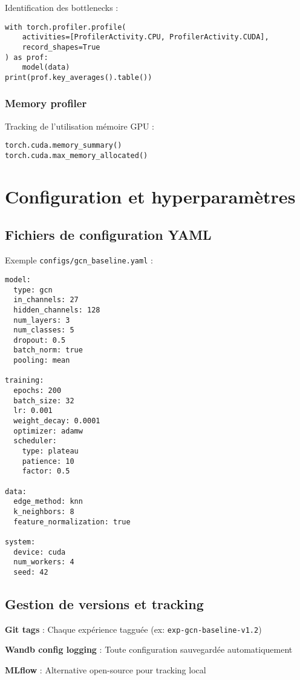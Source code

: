 Identification des bottlenecks :
\begin{verbatim}
with torch.profiler.profile(
    activities=[ProfilerActivity.CPU, ProfilerActivity.CUDA],
    record_shapes=True
) as prof:
    model(data)
print(prof.key_averages().table())
\end{verbatim}

\subsubsection{Memory profiler}

Tracking de l'utilisation mémoire GPU :
\begin{verbatim}
torch.cuda.memory_summary()
torch.cuda.max_memory_allocated()
\end{verbatim}

\section{Configuration et hyperparamètres}

\subsection{Fichiers de configuration YAML}

Exemple \texttt{configs/gcn\_baseline.yaml} :
\begin{verbatim}
model:
  type: gcn
  in_channels: 27
  hidden_channels: 128
  num_layers: 3
  num_classes: 5
  dropout: 0.5
  batch_norm: true
  pooling: mean

training:
  epochs: 200
  batch_size: 32
  lr: 0.001
  weight_decay: 0.0001
  optimizer: adamw
  scheduler:
    type: plateau
    patience: 10
    factor: 0.5

data:
  edge_method: knn
  k_neighbors: 8
  feature_normalization: true

system:
  device: cuda
  num_workers: 4
  seed: 42
\end{verbatim}

\subsection{Gestion de versions et tracking}

\textbf{Git tags} : Chaque expérience tagguée (ex: \texttt{exp-gcn-baseline-v1.2})

\textbf{Wandb config logging} : Toute configuration sauvegardée automatiquement

\textbf{MLflow} : Alternative open-source pour tracking local

